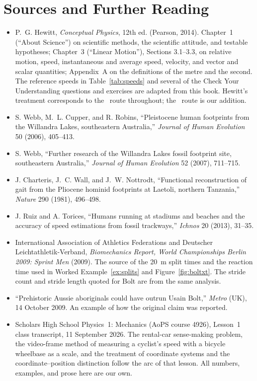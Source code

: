 \documentclass[11pt,twoside,openany]{book}
\newcommand{\viewtag}[3]{\fcolorbox{#2}{#3}{\footnotesize\textbf{\textcolor{#2}{#1}}}}
\newcommand{\elemtag}{\viewtag{Elementary}{elemcol}{elempale}}
\newcommand{\calctag}{\viewtag{Calculus}{calccol}{calcpale}}
\begin{document}
\section*{Sources and Further Reading}
\begin{itemize}[itemsep=3pt]
  \item P.~G. Hewitt, \emph{Conceptual Physics}, 12th ed. (Pearson, 2014). Chapter~1 (``About Science'') on scientific methods, the scientific attitude, and testable hypotheses; Chapter~3 (``Linear Motion''), Sections 3.1--3.3, on relative motion, speed, instantaneous and average speed, velocity, and vector and scalar quantities; Appendix~A on the definitions of the metre and the second. The reference speeds in Table~\ref{tab:speeds} and several of the Check Your Understanding questions and exercises are adapted from this book. Hewitt's treatment corresponds to the \elemtag\ route throughout; the \calctag\ route is our addition.
  \item S. Webb, M.~L. Cupper, and R. Robins, ``Pleistocene human footprints from the Willandra Lakes, southeastern Australia,'' \emph{Journal of Human Evolution} 50 (2006), 405--413.
  \item S. Webb, ``Further research of the Willandra Lakes fossil footprint site, southeastern Australia,'' \emph{Journal of Human Evolution} 52 (2007), 711--715.
  \item J. Charteris, J.~C. Wall, and J.~W. Nottrodt, ``Functional reconstruction of gait from the Pliocene hominid footprints at Laetoli, northern Tanzania,'' \emph{Nature} 290 (1981), 496--498.
  \item J. Ruiz and A. Torices, ``Humans running at stadiums and beaches and the accuracy of speed estimations from fossil trackways,'' \emph{Ichnos} 20 (2013), 31--35.
  \item International Association of Athletics Federations and Deutscher Leichtathletik-Verband, \emph{Biomechanics Report, World Championships Berlin 2009: Sprint Men} (2009). The source of the \SI{20}{\metre} split times and the reaction time used in Worked Example~\ref{ex:splits} and Figure~\ref{fig:boltxt}. The stride count and stride length quoted for Bolt are from the same analysis.
  \item ``Prehistoric Aussie aboriginals could have outrun Usain Bolt,'' \emph{Metro} (UK), 14 October 2009. An example of how the original claim was reported.
  \item Scholars High School Physics~1: Mechanics (AoPS course 4926), Lesson~1 class transcript, 11 September 2026. The rental-car sense-making problem, the video-frame method of measuring a cyclist's speed with a bicycle wheelbase as a scale, and the treatment of coordinate systems and the coordinate--position distinction follow the arc of that lesson. All numbers, examples, and prose here are our own.

\end{itemize}
\end{document}

